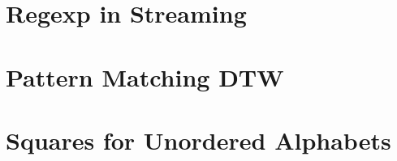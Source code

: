\documentclass[aspectratio=169,handout]{beamer}
\begin{document}
\begin{frame}
\end{frame}

\section{Regexp in Streaming}
%
\section{Pattern Matching DTW}
%
\section{Squares for Unordered Alphabets}


\end{document}
